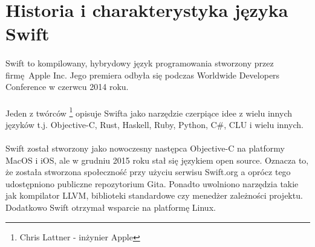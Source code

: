 \documentclass[12pt,oneside,a4paper]{report}
\begin{document}
\section{Historia i charakterystyka języka Swift}
\paragraph{}Swift to kompilowany, hybrydowy język programowania stworzony przez firmę Apple Inc. Jego premiera odbyła się podczas Worldwide Developers Conference w czerwcu 2014 roku.\cite{swiftHistory} 
\paragraph{}Jeden z twórców \footnote{Chris Lattner - inżynier Apple} opisuje Swifta jako narzędzie czerpiące idee z wielu innych języków t.j. Objective-C, Rust, Haskell, Ruby, Python, C\#, CLU i wielu innych. 
\paragraph{}Swift został stworzony jako nowoczesny następca Objective-C na platformy MacOS i iOS, ale w grudniu 2015 roku stał się językiem open source. Oznacza to, że została stworzona społeczność przy użyciu serwisu Swift.org a oprócz tego udostępniono publiczne repozytorium Gita. Ponadto uwolniono narzędzia takie jak kompilator LLVM, biblioteki standardowe czy menedżer zależności projektu. Dodatkowo Swift otrzymał wsparcie na platformę Linux.\cite{swiftOpensource}
\end{document}

